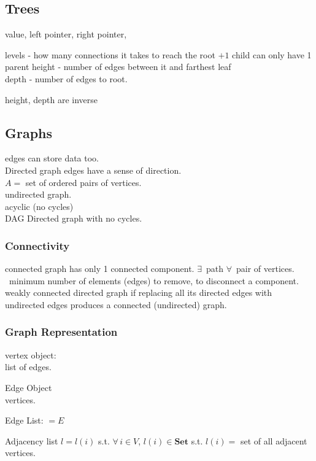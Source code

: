 \documentclass[10pt]{amsart}
\begin{document}
\subsection{Trees}

value, left pointer, right pointer,

levels - how many connections it takes to reach the root $+ 1$
child can only have 1 parent
height - number of edges between it and farthest leaf \\
depth - number of edges to root.

height, depth are inverse

\subsection{Graphs}

edges can store data too. \\
Directed graph edges have a sense of direction. \\
$A =$ set of ordered pairs of vertices. \\
undirected graph. \\
acyclic (no cycles) \\
DAG Directed graph with no cycles.

\subsubsection{Connectivity} 

connected graph has only 1 connected component. $\exists \, $ path $\forall \, $ pair of vertices. \\
\qquad \, minimum number of elements (edges) to remove, to disconnect a component. \\

weakly connected directed graph if replacing all its directed edges with undirected edges produces a connected (undirected) graph. 

\subsubsection{Graph Representation} 

vertex object: \\
list of edges. 

Edge Object \\
vertices. 

Edge List: $=E$ 

Adjacency list $l = l(i)$ s.t. $\forall \, i \in V$, $l(i) \in \textbf{Set}$ s.t. $l(i) = $ set of all adjacent vertices. \\
\end{document}
